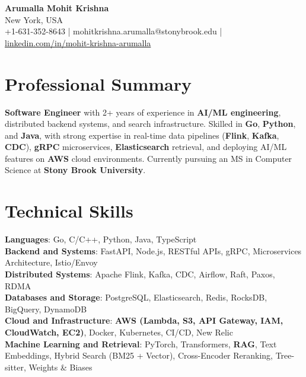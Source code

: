 \documentclass[letterpaper,11pt]{article}
\begin{document}
\begin{center}
  {\Large \textbf{Arumalla Mohit Krishna}} \\
  New York, USA \\
  +1-631-352-8643 \enspace | \enspace mohitkrishna.arumalla@stonybrook.edu \enspace | \enspace \href{https://www.linkedin.com/in/mohit-krishna-arumalla}{linkedin.com/in/mohit-krishna-arumalla}
\end{center}

\section{Professional Summary}
  \begin{itemize}[leftmargin=0.15in, label={}]
    \small{\item{
     \textbf{Software Engineer} with 2+ years of experience in \textbf{AI/ML engineering}, distributed backend systems, and search infrastructure. Skilled in \textbf{Go}, \textbf{Python}, and \textbf{Java}, with strong expertise in real-time data pipelines (\textbf{Flink}, \textbf{Kafka}, \textbf{CDC}), \textbf{gRPC} microservices, \textbf{Elasticsearch} retrieval, and deploying AI/ML features on \textbf{AWS} cloud environments. Currently pursuing an MS in Computer Science at \textbf{Stony Brook University}.
    }}
  \end{itemize}
\vspace{-16pt}

\section{Technical Skills}
 \begin{itemize}[leftmargin=0.15in, label={}]
    \small{\item{
     \textbf{Languages}: Go, C/C++, Python, Java, TypeScript \\
     \textbf{Backend and Systems}: FastAPI, Node.js, RESTful APIs, gRPC, Microservices Architecture, Istio/Envoy \\
     \textbf{Distributed Systems}: Apache Flink, Kafka, CDC, Airflow, Raft, Paxos, RDMA \\
     \textbf{Databases and Storage}: PostgreSQL, Elasticsearch, Redis, RocksDB, BigQuery, DynamoDB \\
     \textbf{Cloud and Infrastructure}: \textbf{AWS (Lambda, S3, API Gateway, IAM, CloudWatch, EC2)}, Docker, Kubernetes, CI/CD, New Relic \\
     \textbf{Machine Learning and Retrieval}: PyTorch, Transformers, \textbf{RAG}, Text Embeddings, Hybrid Search (BM25 + Vector), Cross-Encoder Reranking, Tree-sitter, Weights \& Biases
    }}
 \end{itemize}
\vspace{-16pt}
\end{document}
